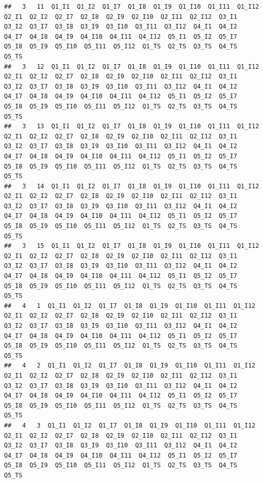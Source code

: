 \documentclass[
]{book}
\begin{document}
\begin{verbatim}
##   3   11  Q1_I1  Q1_I2  Q1_I7  Q1_I8  Q1_I9  Q1_I10  Q1_I11  Q1_I12  Q2_I1  Q2_I2  Q2_I7  Q2_I8  Q2_I9  Q2_I10  Q2_I11  Q2_I12  Q3_I1  Q3_I2  Q3_I7  Q3_I8  Q3_I9  Q3_I10  Q3_I11  Q3_I12  Q4_I1  Q4_I2  Q4_I7  Q4_I8  Q4_I9  Q4_I10  Q4_I11  Q4_I12  Q5_I1  Q5_I2  Q5_I7  Q5_I8  Q5_I9  Q5_I10  Q5_I11  Q5_I12  Q1_TS  Q2_TS  Q3_TS  Q4_TS  Q5_TS
##   3   12  Q1_I1  Q1_I2  Q1_I7  Q1_I8  Q1_I9  Q1_I10  Q1_I11  Q1_I12  Q2_I1  Q2_I2  Q2_I7  Q2_I8  Q2_I9  Q2_I10  Q2_I11  Q2_I12  Q3_I1  Q3_I2  Q3_I7  Q3_I8  Q3_I9  Q3_I10  Q3_I11  Q3_I12  Q4_I1  Q4_I2  Q4_I7  Q4_I8  Q4_I9  Q4_I10  Q4_I11  Q4_I12  Q5_I1  Q5_I2  Q5_I7  Q5_I8  Q5_I9  Q5_I10  Q5_I11  Q5_I12  Q1_TS  Q2_TS  Q3_TS  Q4_TS  Q5_TS
##   3   13  Q1_I1  Q1_I2  Q1_I7  Q1_I8  Q1_I9  Q1_I10  Q1_I11  Q1_I12  Q2_I1  Q2_I2  Q2_I7  Q2_I8  Q2_I9  Q2_I10  Q2_I11  Q2_I12  Q3_I1  Q3_I2  Q3_I7  Q3_I8  Q3_I9  Q3_I10  Q3_I11  Q3_I12  Q4_I1  Q4_I2  Q4_I7  Q4_I8  Q4_I9  Q4_I10  Q4_I11  Q4_I12  Q5_I1  Q5_I2  Q5_I7  Q5_I8  Q5_I9  Q5_I10  Q5_I11  Q5_I12  Q1_TS  Q2_TS  Q3_TS  Q4_TS  Q5_TS
##   3   14  Q1_I1  Q1_I2  Q1_I7  Q1_I8  Q1_I9  Q1_I10  Q1_I11  Q1_I12  Q2_I1  Q2_I2  Q2_I7  Q2_I8  Q2_I9  Q2_I10  Q2_I11  Q2_I12  Q3_I1  Q3_I2  Q3_I7  Q3_I8  Q3_I9  Q3_I10  Q3_I11  Q3_I12  Q4_I1  Q4_I2  Q4_I7  Q4_I8  Q4_I9  Q4_I10  Q4_I11  Q4_I12  Q5_I1  Q5_I2  Q5_I7  Q5_I8  Q5_I9  Q5_I10  Q5_I11  Q5_I12  Q1_TS  Q2_TS  Q3_TS  Q4_TS  Q5_TS
##   3   15  Q1_I1  Q1_I2  Q1_I7  Q1_I8  Q1_I9  Q1_I10  Q1_I11  Q1_I12  Q2_I1  Q2_I2  Q2_I7  Q2_I8  Q2_I9  Q2_I10  Q2_I11  Q2_I12  Q3_I1  Q3_I2  Q3_I7  Q3_I8  Q3_I9  Q3_I10  Q3_I11  Q3_I12  Q4_I1  Q4_I2  Q4_I7  Q4_I8  Q4_I9  Q4_I10  Q4_I11  Q4_I12  Q5_I1  Q5_I2  Q5_I7  Q5_I8  Q5_I9  Q5_I10  Q5_I11  Q5_I12  Q1_TS  Q2_TS  Q3_TS  Q4_TS  Q5_TS
##   4   1  Q1_I1  Q1_I2  Q1_I7  Q1_I8  Q1_I9  Q1_I10  Q1_I11  Q1_I12  Q2_I1  Q2_I2  Q2_I7  Q2_I8  Q2_I9  Q2_I10  Q2_I11  Q2_I12  Q3_I1  Q3_I2  Q3_I7  Q3_I8  Q3_I9  Q3_I10  Q3_I11  Q3_I12  Q4_I1  Q4_I2  Q4_I7  Q4_I8  Q4_I9  Q4_I10  Q4_I11  Q4_I12  Q5_I1  Q5_I2  Q5_I7  Q5_I8  Q5_I9  Q5_I10  Q5_I11  Q5_I12  Q1_TS  Q2_TS  Q3_TS  Q4_TS  Q5_TS
##   4   2  Q1_I1  Q1_I2  Q1_I7  Q1_I8  Q1_I9  Q1_I10  Q1_I11  Q1_I12  Q2_I1  Q2_I2  Q2_I7  Q2_I8  Q2_I9  Q2_I10  Q2_I11  Q2_I12  Q3_I1  Q3_I2  Q3_I7  Q3_I8  Q3_I9  Q3_I10  Q3_I11  Q3_I12  Q4_I1  Q4_I2  Q4_I7  Q4_I8  Q4_I9  Q4_I10  Q4_I11  Q4_I12  Q5_I1  Q5_I2  Q5_I7  Q5_I8  Q5_I9  Q5_I10  Q5_I11  Q5_I12  Q1_TS  Q2_TS  Q3_TS  Q4_TS  Q5_TS
##   4   3  Q1_I1  Q1_I2  Q1_I7  Q1_I8  Q1_I9  Q1_I10  Q1_I11  Q1_I12  Q2_I1  Q2_I2  Q2_I7  Q2_I8  Q2_I9  Q2_I10  Q2_I11  Q2_I12  Q3_I1  Q3_I2  Q3_I7  Q3_I8  Q3_I9  Q3_I10  Q3_I11  Q3_I12  Q4_I1  Q4_I2  Q4_I7  Q4_I8  Q4_I9  Q4_I10  Q4_I11  Q4_I12  Q5_I1  Q5_I2  Q5_I7  Q5_I8  Q5_I9  Q5_I10  Q5_I11  Q5_I12  Q1_TS  Q2_TS  Q3_TS  Q4_TS  Q5_TS

\end{verbatim}
\end{document}
